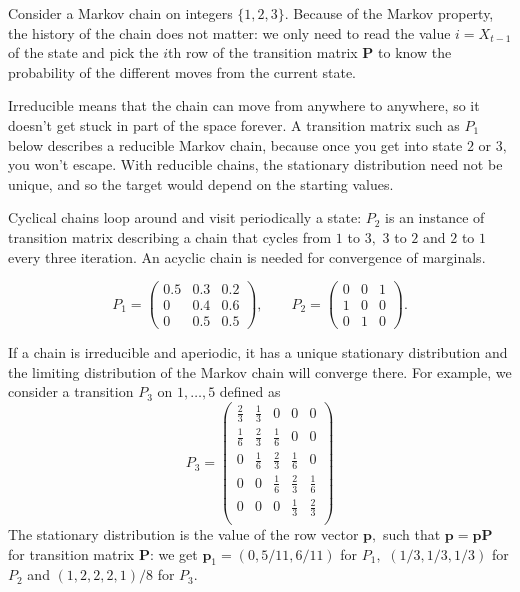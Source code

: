 \documentclass[
  11pt,
  letterpaper,
]{scrbook}
\theoremstyle{definition}
\theoremstyle{plain}
\theoremstyle{plain}
\theoremstyle{definition}
\theoremstyle{definition}
\theoremstyle{remark}
\begin{document}
Consider a Markov chain on integers \(\{1, 2, 3\}.\) Because of the
Markov property, the history of the chain does not matter: we only need
to read the value \(i=X_{t-1}\) of the state and pick the \(i\)th row of
the transition matrix \(\mathbf{P}\) to know the probability of the
different moves from the current state.

Irreducible means that the chain can move from anywhere to anywhere, so
it doesn't get stuck in part of the space forever. A transition matrix
such as \(P_1\) below describes a reducible Markov chain, because once
you get into state \(2\) or \(3,\) you won't escape. With reducible
chains, the stationary distribution need not be unique, and so the
target would depend on the starting values.

Cyclical chains loop around and visit periodically a state: \(P_2\) is
an instance of transition matrix describing a chain that cycles from
\(1\) to \(3,\) \(3\) to \(2\) and \(2\) to \(1\) every three iteration.
An acyclic chain is needed for convergence of marginals.

\[
P_1 = \begin{pmatrix}
0.5 & 0.3 & 0.2 \\
0 & 0.4 & 0.6 \\
0 & 0.5 & 0.5
\end{pmatrix},
\qquad
P_2 = \begin{pmatrix}
0 & 0 & 1 \\
1 & 0 & 0 \\
0 & 1 & 0
\end{pmatrix}.
\]

If a chain is irreducible and aperiodic, it has a unique stationary
distribution and the limiting distribution of the Markov chain will
converge there. For example, we consider a transition \(P_3\) on
\(1, \ldots, 5\) defined as \[
P_3 = \begin{pmatrix}
\frac{2}{3} & \frac{1}{3} &  0 & 0 & 0 \\
\frac{1}{6} & \frac{2}{3} & \frac{1}{6} & 0 & 0 \\
0 & \frac{1}{6} & \frac{2}{3} & \frac{1}{6} & 0 \\
0 & 0 & \frac{1}{6} & \frac{2}{3} & \frac{1}{6} \\
0 & 0 & 0 &  \frac{1}{3}  & \frac{2}{3} \\
\end{pmatrix}
\] The stationary distribution is the value of the row vector
\(\boldsymbol{p},\) such that
\(\boldsymbol{p} = \boldsymbol{p}\mathbf{P}\) for transition matrix
\(\mathbf{P}\): we get \(\boldsymbol{p}_1=(0, 5/11, 6/11)\) for \(P_1,\)
\((1/3, 1/3, 1/3)\) for \(P_2\) and \((1,2,2,2,1)/8\) for \(P_3.\)
\end{document}
